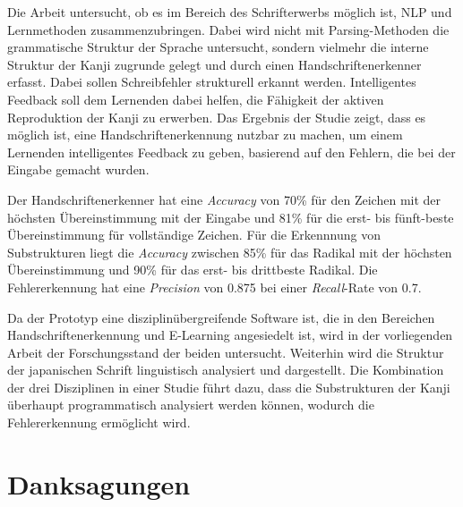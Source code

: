 Die Arbeit untersucht, ob es im Bereich des Schrifterwerbs möglich ist, 
NLP und Lernmethoden zusammenzubringen. Dabei wird nicht mit Parsing-Methoden 
die grammatische Struktur der Sprache untersucht, sondern vielmehr die interne 
Struktur der Kanji zugrunde gelegt und durch einen Handschriftenerkenner erfasst.
Dabei sollen Schreibfehler strukturell erkannt werden. Intelligentes Feedback 
soll dem Lernenden dabei helfen, die Fähigkeit der aktiven Reproduktion der 
Kanji zu erwerben.
Das Ergebnis der Studie zeigt, dass es möglich ist, eine Handschriftenerkennung
nutzbar zu machen, um einem Lernenden intelligentes Feedback zu geben,
basierend auf den Fehlern, die bei der Eingabe gemacht wurden.

Der Handschriftenerkenner hat eine \emph{Accuracy} von 70\% für den Zeichen mit der
höchsten Übereinstimmung mit der Eingabe und
81\% für die erst- bis fünft-beste Übereinstimmung für vollständige Zeichen.
Für die Erkennnung von Substrukturen liegt die \emph{Accuracy} zwischen
85\% für das Radikal mit der höchsten Übereinstimmung und
90\% für das erst- bis drittbeste Radikal.
Die Fehlererkennung hat eine \emph{Precision} von 0.875 bei einer 
\emph{Recall}-Rate von 0.7.

Da der Prototyp eine disziplinübergreifende Software ist, 
die in den Bereichen Handschriftenerkennung und E-Learning angesiedelt ist,
wird in der vorliegenden Arbeit der Forschungsstand der beiden untersucht.
Weiterhin wird die Struktur der japanischen Schrift linguistisch analysiert und
dargestellt. Die Kombination der drei Disziplinen in einer Studie führt dazu, 
dass die Substrukturen der Kanji überhaupt programmatisch analysiert werden 
können, wodurch die Fehlererkennung ermöglicht wird.

\chapter*{Danksagungen}
\label{chap:danksagungen}

